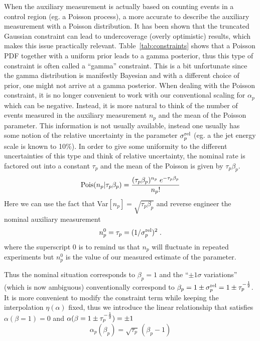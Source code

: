 
When the auxiliary measurement is actually based on counting events in a control region (eg. a Poisson process), a more accurate to describe the auxiliary measurement with a Poisson distribution.  It has been shown that the truncated Gaussian constraint can lead to undercoverage (overly optimistic) results, which makes this issue practically relevant.  Table~\ref{tab:constraints} shows that a Poisson PDF together with a uniform prior leads to a gamma posterior, thus this type of constraint is often called a ``gamma'' constraint.  This is a bit unfortunate since the gamma distribution is manifestly Bayesian and with a different choice of prior, one might not arrive at a gamma posterior.  When dealing with the Poisson constraint, it is no longer convenient to work with  our conventional scaling for $\alpha_p$ which can be negative.  Instead, it is more natural to think of the number of events measured in the auxiliary measurement $n_p$ and the mean of the Poisson parameter.  This information is not usually available, instead one usually has some notion of the relative uncertainty in the parameter $\sigma_p^{\rm rel}$ (eg. a the jet energy scale is known to 10\%).  In order to give some uniformity to the different uncertainties of this type and think of relative uncertainty, the nominal rate is factored out into a constant $\tau_p$ and the mean of the Poisson is given by $\tau_p \beta_p$.  
\begin{equation}
{\ensuremath{\rm Pois}}(n_p | \tau_p \beta_p) =\frac{ (\tau_p \beta_p)^{n_p} \; e^{-\tau_p \beta_p} } {n_p!}
\end{equation}
Here we can use the fact that Var$[n_p]=\sqrt{\tau_p\beta_p}$ and reverse engineer the nominal auxiliary measurement 
\begin{equation}
n_p^0 =  \tau_p = (1/\sigma_{p}^{\rm rel})^2\; .
\end{equation}
where the superscript $0$ is to remind us that $n_p$ will fluctuate in repeated experiments but $n_p^0$ is the value of our measured estimate of the parameter.

Thus the nominal situation corresponds to $\beta_p=1$ and the ``$\pm 1\sigma$ variations'' (which is now ambiguous) conventionally correspond to $\beta_p=1\pm \sigma_p^{\rm rel} = 1\pm \tau_p^{-\frac{1}{2}}$.   It is more convenient to modify the constraint term while keeping the interpolation $\eta(\alpha)$ fixed, thus we introduce the linear relationship that satisfies $\alpha(\beta=1)=0$ and $\alpha(\beta=1\pm \tau_p^{-\frac{1}{2}})=\pm 1$
\begin{equation}
\alpha_p(\beta_p) = \sqrt{\tau_p}\,(\beta_p -1)
\end{equation}

